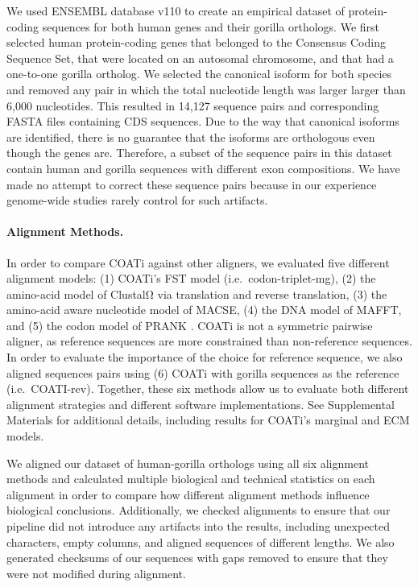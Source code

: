 \documentclass[12pt,letterpaper]{article}
\begin{document}
We used ENSEMBL database v110 \citep{ensembl_hubbard_2002} to create an empirical dataset of protein-coding sequences for both human genes and their gorilla orthologs. We first selected human protein-coding genes that belonged to the Consensus Coding Sequence Set, that were located on an autosomal chromosome, and that had a one-to-one gorilla ortholog. We selected the canonical isoform for both species and removed any pair in which the total nucleotide length was larger larger than 6,000 nucleotides. This resulted in 14,127 sequence pairs and corresponding FASTA files containing CDS sequences. Due to the way that canonical isoforms are identified, there is no guarantee that the isoforms are orthologous even though the genes are. Therefore, a subset of the sequence pairs in this dataset contain human and gorilla sequences with different exon compositions. We have made no attempt to correct these sequence pairs because in our experience genome-wide studies rarely control for such artifacts.

\paragraph{Alignment Methods.}

In order to compare COATi against other aligners, we evaluated five different alignment models: (1) COATi's FST model (i.e.\ codon-triplet-mg), (2) the amino-acid model of ClustalΩ via translation and reverse translation, (3) the amino-acid aware nucleotide model of MACSE, (4) the DNA model of MAFFT, and (5) the codon model of PRANK \citep{clustal_omega_sievers_2011,ranwez_macse_2018,katoh2013mafft,prank_loytynoja_2014}. 
COATi is not a symmetric pairwise aligner, as reference sequences are more constrained than non-reference sequences. In order to evaluate the importance of the choice for reference sequence, we also aligned sequences pairs using (6) COATi with gorilla sequences as the reference (i.e.\ COATI-rev). Together, these six methods allow us to evaluate both different alignment strategies and different software implementations. See Supplemental Materials for additional details, including results for COATi's marginal and ECM models.

We aligned our dataset of human-gorilla orthologs using all six alignment methods and calculated multiple biological and technical statistics on each alignment in order to compare how different alignment methods influence biological conclusions.
%
Additionally, we checked alignments to ensure that our pipeline did not introduce any artifacts into the results, including unexpected characters, empty columns, and aligned sequences of different lengths. We also generated checksums of our sequences with gaps removed to ensure that they were not modified during alignment.
\end{document}
